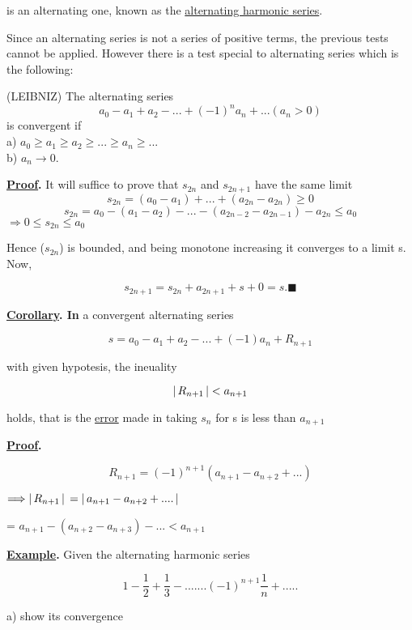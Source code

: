 \documentclass[11pt]{amsbook}
\newcommand\tab[1][2cm]{\hspace*{#1}}
\newcommand\tad[1][1cm]{\hspace*{#1}}
\newcommand\tal[1][0.5cm]{\hspace*{#1}}
\begin{document}
is an alternating one, known as the \underline{alternating harmonic series}.
\par Since an alternating series is not a series of positive terms, the previous tests cannot be applied. However there is a test special to alternating series which is the following:
\begin{thm}{(LEIBNIZ)}
The alternating series
		\[
			a_0 - a_1 + a_2 - ... + (-1)^n a_n  + ... (a_n > 0)
		\]
is convergent if \\
a) $a_0 \geq a_1 \geq a_2 \geq ... \geq a_n \geq ...$ \\
b) $a_n \rightarrow 0$.
\end{thm}
\tad	\textbf{\underline{Proof}.} It will suffice to prove that $s_{2n}$ and $s_{2n+1}$ have the same limit
\[
s_{2n} = (a_{0}-a_{1})+ ... +(a_{2n}-a_{2n})\geq 0 \tag{from 1}\label{myeq}
\] 
\[
s_{2n} = a_{0}-(a_{1}-a_{2})-...-(a_{2n-2}-a_{2n-1})-a_{2n} \leq a_{0} \tag{from 1}\label{mye1q}
\]
\tab \tal $\Longrightarrow 0 \leq s_{2n} \leq a_{0}$

Hence ($s_{2n}$) is bounded, and being monotone increasing it converges to a limit s. Now,

\[
s_{2n+1} = s_{2n}+a_{2n+1} + s + 0= s.\blacksquare
\]

\tad	\textbf{\underline{Corollary}. In} a convergent alternating series

\[
s = a_{0}-a_{1}+a_{2}-...+(-1) a_{n}+R_{n+1}
\]

with given hypotesis, the ineuality

\[
\left \lvert \, R_{n+1} \, \right \rvert < a_{n+1}
\]

holds, that is the \underline{error} made in taking $s_{n}$ for s is less than $a_{n+1}$

\tad	\textbf{\underline{Proof}.}

\[
R_{n+1} = (-1)^{n+1}(a_{n+1}-a_{n+2}+...)
\]

\tab  $\Longrightarrow \left \lvert \, R_{n+1} \, \right \rvert \text{}=\left \lvert \, a_{n+1}-a_{n+2}+ .... \, \right \rvert $

\tab \tab   \text{   } = $a_{n+1}-(a_{n+2}-a_{n+3})-... < a_{n+1}$

\tad	\textbf{\underline{Example}. } Given the alternating harmonic series

\[
1-\frac{1}{2} + \frac{1}{3} - ....... (-1)^{n+1}\frac{1}{n} + .....
\]

\tad a) show its convergence

\end{document}
